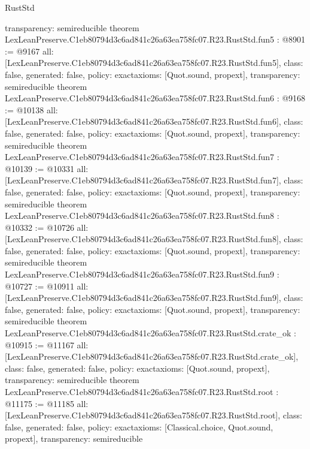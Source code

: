 \begin{lexlean}{RustStd}
\begin{coremodule}
{  transparency: semireducible
}
theorem LexLeanPreserve.C1eb80794d3c6ad841c26a63ea758fc07.R23.RustStd.fun5 : @8901 := @9167 {
  all: [LexLeanPreserve.C1eb80794d3c6ad841c26a63ea758fc07.R23.RustStd.fun5],
  class: false,
  generated: false,
  policy: exact{axioms: [Quot.sound, propext]},
  transparency: semireducible
}
theorem LexLeanPreserve.C1eb80794d3c6ad841c26a63ea758fc07.R23.RustStd.fun6 : @9168 := @10138 {
  all: [LexLeanPreserve.C1eb80794d3c6ad841c26a63ea758fc07.R23.RustStd.fun6],
  class: false,
  generated: false,
  policy: exact{axioms: [Quot.sound, propext]},
  transparency: semireducible
}
theorem LexLeanPreserve.C1eb80794d3c6ad841c26a63ea758fc07.R23.RustStd.fun7 : @10139 := @10331 {
  all: [LexLeanPreserve.C1eb80794d3c6ad841c26a63ea758fc07.R23.RustStd.fun7],
  class: false,
  generated: false,
  policy: exact{axioms: [Quot.sound, propext]},
  transparency: semireducible
}
theorem LexLeanPreserve.C1eb80794d3c6ad841c26a63ea758fc07.R23.RustStd.fun8 : @10332 := @10726 {
  all: [LexLeanPreserve.C1eb80794d3c6ad841c26a63ea758fc07.R23.RustStd.fun8],
  class: false,
  generated: false,
  policy: exact{axioms: [Quot.sound, propext]},
  transparency: semireducible
}
theorem LexLeanPreserve.C1eb80794d3c6ad841c26a63ea758fc07.R23.RustStd.fun9 : @10727 := @10911 {
  all: [LexLeanPreserve.C1eb80794d3c6ad841c26a63ea758fc07.R23.RustStd.fun9],
  class: false,
  generated: false,
  policy: exact{axioms: [Quot.sound, propext]},
  transparency: semireducible
}
theorem LexLeanPreserve.C1eb80794d3c6ad841c26a63ea758fc07.R23.RustStd.crate_ok : @10915 := @11167 {
  all: [LexLeanPreserve.C1eb80794d3c6ad841c26a63ea758fc07.R23.RustStd.crate_ok],
  class: false,
  generated: false,
  policy: exact{axioms: [Quot.sound, propext]},
  transparency: semireducible
}
theorem LexLeanPreserve.C1eb80794d3c6ad841c26a63ea758fc07.R23.RustStd.root : @11175 := @11185 {
  all: [LexLeanPreserve.C1eb80794d3c6ad841c26a63ea758fc07.R23.RustStd.root],
  class: false,
  generated: false,
  policy: exact{axioms: [Classical.choice, Quot.sound, propext]},
  transparency: semireducible
}


\end{coremodule}
\end{lexlean}
